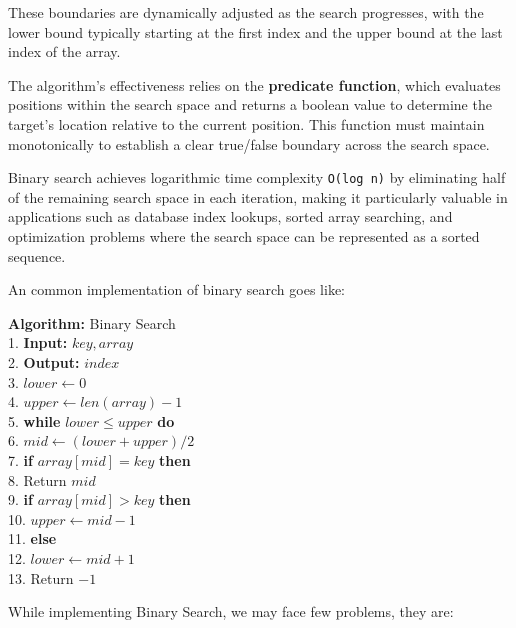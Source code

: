 \documentclass[10pt,twocolumn]{article}
\begin{document}
		These boundaries are dynamically adjusted as the search progresses, with the lower bound typically starting at the first index and the upper bound at the last index of the array.
		
		
		The algorithm's effectiveness relies on the \textbf{predicate function}, which evaluates positions within the search space and returns a boolean value to determine the target's location relative to the current position. This function must maintain monotonically to establish a clear true/false boundary across the search space.
		
	 	Binary search achieves logarithmic time complexity \texttt{O(log n)} by eliminating half of the remaining search space in each iteration, making it particularly valuable in applications such as database index lookups, sorted array searching, and optimization problems where the search space can be represented as a sorted sequence.
	 	
	 	An common implementation of binary search goes like:
	 	
	 	\vspace{10pt}
	 	
	 	\noindent
	 	\textbf{Algorithm:} Binary Search\\
	 	1. \textbf{Input:} \(key, array\) \\
	 	2. \textbf{Output:} \(index\) \\
	 	3. \(lower \gets 0\) \\
	 	4. \(upper \gets len(array) - 1\) \\
	 	5. \textbf{while} \(lower \leq upper\) \textbf{ do} \\
	 	6. \quad\(mid \gets (lower + upper) / 2\) \\
	 	7. \quad \textbf{if} \(array[mid] = key \) \textbf{ then} \\
	 	8. \quad \quad Return \(mid\) \\
	 	9. \quad \textbf{if} \(array[mid] > key \) \textbf{ then} \\
	 	10. \quad \quad \(upper \gets mid - 1\) \\
	 	11. \quad \textbf{else} \\
	 	12. \quad \quad \(lower \gets mid + 1\) \\
	 	13. Return \(-1\)
	 	
	 	\vspace{10pt}
		
		While implementing Binary Search, we may face few problems, they are:
	
\end{document}
